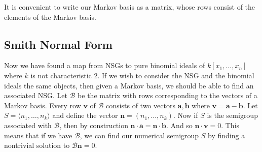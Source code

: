 \documentclass[11pt]{amsart}
\theoremstyle{plain}
\theoremstyle{definition}
\begin{document}
It is convenient to write our Markov basis as a matrix, whose rows consist of
the elements of the Markov basis.

\subsection{Smith Normal Form}
Now we have found a map from NSGs to pure binomial ideals of $k[x_1,\dots,x_n]$ where $k$ is not characteristic 2. If we wish to consider the NSG and the binomial ideals the same objects, then given a Markov basis, we should be able to find an associated NSG.
Let $\mathcal{B}$ be the matrix with rows corresponding to the vectors of a Markov basis.
Every row $\mathbf{v}$ of $\mathcal{B}$ consists of two vectors $\mathbf{a},\mathbf{b}$ where $\mathbf{v}=\mathbf{a}-\mathbf{b}$. Let $S=
\langle n_1,\dots,n_k\rangle$ and define the vector $\mathbf{n}=(n_1,\dots,n_k)$. Now
if $S$ is the semigroup associated with $\mathcal{B}$, then by  construction $\mathbf{n}\cdot \mathbf{a}=\mathbf{n}\cdot \mathbf{b}$. And so $\mathbf{n}\cdot\mathbf{v}=0$. This means that if we have $\mathcal{B}$, we can
find our numerical semigroup $S$ by finding a nontrivial solution to $\mathcal{B}\mathbf{n}=0$.
\end{document}
